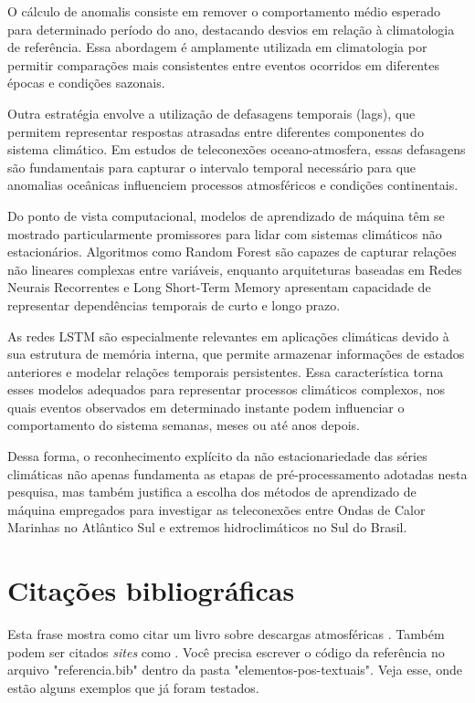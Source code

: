 	O cálculo de anomalis consiste em remover o comportamento médio esperado para determinado período do ano, destacando desvios em relação à climatologia de referência.
	Essa abordagem é amplamente utilizada em climatologia por permitir comparações mais consistentes entre eventos ocorridos em diferentes épocas e condições sazonais.

	Outra estratégia envolve a utilização de defasagens temporais (lags), que permitem representar respostas atrasadas entre diferentes componentes do sistema climático.
	Em estudos de teleconexões oceano-atmosfera, essas defasagens são fundamentais para capturar o intervalo temporal necessário para que anomalias oceânicas influenciem processos atmosféricos e condições continentais.

	Do ponto de vista computacional, modelos de aprendizado de máquina têm se mostrado particularmente promissores para lidar com sistemas climáticos não estacionários.
	Algoritmos como Random Forest são capazes de capturar relações não lineares complexas entre variáveis, enquanto arquiteturas baseadas em Redes Neurais Recorrentes e Long Short-Term Memory apresentam capacidade de representar dependências temporais de curto e longo prazo.

	As redes LSTM são especialmente relevantes em aplicações climáticas devido à sua estrutura de memória interna, que permite armazenar informações de estados anteriores e modelar relações temporais persistentes.
	Essa característica torna esses modelos adequados para representar processos climáticos complexos, nos quais eventos observados em determinado instante podem influenciar o comportamento do sistema semanas, meses ou até anos depois.

	Dessa forma, o reconhecimento explícito da não estacionariedade das séries climáticas não apenas fundamenta as etapas de pré-processamento adotadas nesta pesquisa, mas também justifica a escolha dos métodos de aprendizado de máquina empregados para investigar as teleconexões entre Ondas de Calor Marinhas no Atlântico Sul e extremos hidroclimáticos no Sul do Brasil.
	


\section{Citações bibliográficas}\label{sec:citacoes}

    Esta frase mostra como citar um livro sobre descargas atmosféricas \cite{rakov2003lightning}. Também podem ser citados \textit{sites} como . Você precisa escrever o código da referência no arquivo "referencia.bib" dentro da pasta "elementos-pos-textuais". Veja esse, onde estão alguns exemplos que já foram testados.        
	
